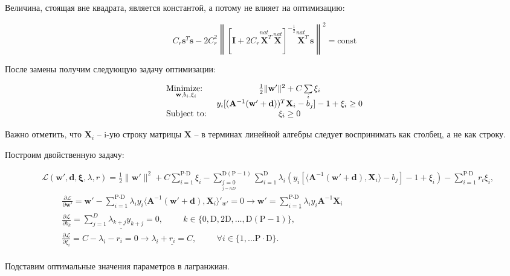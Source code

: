 \documentclass[CEJM,PDF]{Class+Reg_in_Molec_Docking} %
\begin{document}
Величина, стоящая вне квадрата, является константой, а потому не влияет на оптимизацию:

$$C_r\mathbf{s}^T\mathbf{s} - 2C_r^2\left\| \left[ \mathbf{I} + 2C_r\overset{nat\;\;\;}{\mathbf{X}^T}\overset{nat}{\mathbf{X}} \right]^{-\frac{1}{2}}\overset{nat\;\;\;}{\mathbf{X}^T}\mathbf{s} \right\|^2 = \text{const}$$

После замены получим следующую задачу оптимизации:

\begin{eqnarray}\label{Class+Regres_new} 
\begin{tabular}{lc}
$\underset{\mathbf{w}, b_i, \xi_{i}}{\text{Minimize: }}$ &$ \frac{1}{2} \|\mathbf{w'}\|^2 + C\sum\limits_{i}\xi_{i}$ \\ 
\multirow{3}{*}{Subject to:}
&$y_{i}[(\mathbf{A}^{-1}(\mathbf{w' + d}))^T\mathbf{X}_{i} - b_j]-1+\xi_{i} \geq 0$\\
&$\xi_{i} \geq 0$
\end{tabular}
\label{eq:primalboth} 
\end{eqnarray}

Важно отметить, что $\mathbf{X}_i$ -- i-ую строку матрицы $\mathbf{X}$ -- в терминах линейной алгебры следует воспринимать как столбец, а не как строку.

Построим двойственную задачу:

\begin{equation}
\begin{aligned}
&\mathcal{L}(\mathbf{w'}, \mathbf{d}, \mathbf{\xi}, \lambda, r) = \frac{1}{2} \|\mathbf{w'}\|^2 + C\sum\limits_{i=1}^{\text{P}\cdot\text{D}}\xi_{i} - 
\sum_{\underset{{j=nD}}{j=0}}^{\text{D}(\text{P}-1)}\sum_{i=1}^{\text{D}}{\lambda_{i} \left( y_{i}[\langle \mathbf{A}^{-1}\left(\mathbf{w}'+\mathbf{d}\right), \mathbf{X}_{i}\rangle - b_j]-1+\xi_{i} \right)} - \sum_{i=1}^{\text{P}\cdot\text{D}}{r_{i}\xi_{i}}, \\
& \hspace{1cm}\frac{\partial{\mathcal{L}}}{\partial{\mathbf{w'}}} = \mathbf{w'} - \sum_{i=1}^{\text{P}\cdot\text{D}}{\lambda_{i}y_{i}\langle \mathbf{A}^{-1}\left(\mathbf{w'}+\mathbf{d}\right), \mathbf{X}_{i} \rangle}'_{w'} = 0 \rightarrow \underline{\mathbf{w}' = \sum_{i=1}^{\text{P}\cdot\text{D}}{\lambda_{i}y_{i}\mathbf{A}^{-1} \mathbf{X}_{i}}} \\
& 
\hspace{1cm}\frac{\partial{\mathcal{L}}}{\partial{b_k}} = \underline{\sum_{j=1}^D{\lambda_{k+j}y_{k+j}} = 0}, \hspace{1cm} k \in \{ 0,\text{D},2\text{D},\hdots,\text{D}(\text{P} - 1) \},  \\
& \hspace{1cm}\frac{\partial{\mathcal{L}}}{\partial{\xi_{i}}} = C - \lambda_{i} - r_{i} = 0 \rightarrow \underline{\lambda_{i} + r_{i} = C}, \hspace{1cm} \forall i \in \{1,\hdots\text{P}\cdot\text{D}\}.
\end{aligned}
\end{equation}
\\
Подставим оптимальные значения параметров в лагранжиан.
\end{document}
